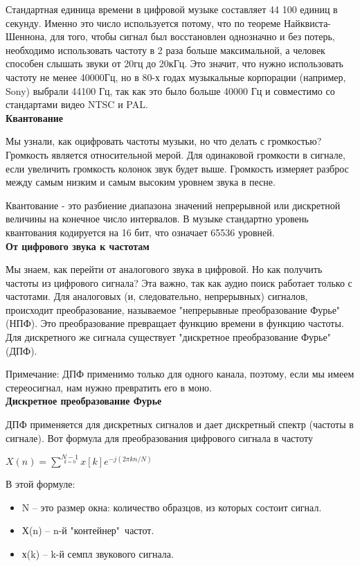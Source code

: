 Стандартная единица времени в цифровой музыке составляет 44 100 единиц в секунду. Именно это число используется потому, что по теореме Найквиста-Шеннона, для того, чтобы сигнал был восстановлен однозначно и без потерь, необходимо использовать частоту в 2 раза больше максимальной, а человек способен слышать звуки от 20гц до 20кГц. Это значит, что нужно использовать частоту не менее 40000Гц, но в 80-х годах музыкальные корпорации (например, Sony) выбрали 44100 Гц, так как это было больше 40000 Гц и совместимо со стандартами видео NTSC и PAL.\\

\noindent \textbf{Квантование}

Мы узнали, как оцифровать частоты музыки, но что делать с громкостью? Громкость является относительной мерой. Для одинаковой громкости в сигнале, если увеличить громкость колонок звук будет выше. Громкость измеряет разброс между самым низким и самым высоким уровнем звука в песне. 

Квантование - это разбиение диапазона значений непрерывной или дискретной величины на конечное число интервалов. В музыке стандартно уровень квантования кодируется на 16 бит, что означает 65536 уровней.\\

\noindent \textbf{От цифрового звука к частотам}

Мы знаем, как перейти от аналогового звука в цифровой. Но как получить частоты из цифрового сигнала? Эта важно, так как аудио поиск работает только с частотами. Для аналоговых (и, следовательно, непрерывных) сигналов, происходит преобразование, называемое "непрерывные преобразование Фурье"(НПФ). Это преобразование превращает функцию времени в функцию частоты. Для дискретного же сигнала существует "дискретное преобразование Фурье"(ДПФ).

Примечание: ДПФ применимо только для одного канала, поэтому, если мы имеем стереосигнал, нам нужно превратить его в моно.\\

\noindent \textbf{Дискретное преобразование Фурье}

ДПФ применяется для дискретных сигналов и дает дискретный спектр (частоты в сигнале). Вот формула для преобразования цифрового сигнала в частоту

\begin{center}
	{\Large $X(n) = \sum^{N-1}\limits_{k=0} x[k]e^{-j(2\pi kn/N)}$}
\end{center}

В этой формуле: 
\begin{itemize}
	\item N -- это размер окна: количество образцов, из которых состоит сигнал.
	\item Х(n) -- n-й "контейнер"\, частот.
	\item х(k) -- k-й семпл звукового сигнала.
\end{itemize}

